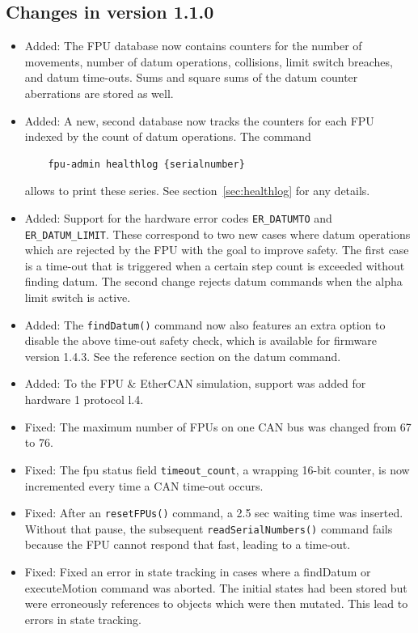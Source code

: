 \documentclass[11pt,a4paper]{report}
\begin{document}
\subsection*{Changes in version 1.1.0}
\begin{itemize}
\item Added: The FPU database now contains counters for the number of
  movements, number of datum operations, collisions, limit switch
  breaches, and datum time-outs. Sums and square sums of the datum
  counter aberrations are stored as well.

\item Added: A new, second database now tracks the counters for each
  FPU indexed by the count of datum operations. The command
  \begin{verbatim}
    fpu-admin healthlog {serialnumber}
  \end{verbatim}
  allows to print these series. See section~\ref{sec:healthlog} for
  any details.

\item Added: Support for the hardware error codes \texttt{ER\_DATUMTO}
  and \texttt{ER\_DATUM\_LIMIT}. These correspond to two new cases
  where datum operations which are rejected by the FPU with the goal
  to improve safety. The first case is a time-out that is triggered
  when a certain step count is exceeded without finding datum.  The
  second change rejects datum commands when the alpha limit switch is
  active.

\item Added: The \texttt{findDatum()} command now also features an
  extra option to disable the above time-out safety check, which is
  available for firmware version 1.4.3. See the reference section on
  the datum command.
  
\item Added: To the FPU \& EtherCAN simulation, support
  was added for hardware 1 protocol l.4. 
  
\item Fixed: The maximum number of FPUs on one CAN bus was changed
  from 67 to 76.
  
\item Fixed: The fpu status field \texttt{timeout\_count}, a wrapping
  16-bit counter, is now incremented every time a CAN time-out occurs.

\item Fixed: After an \texttt{resetFPUs()} command, a 2.5 sec waiting
  time was inserted. Without that pause, the subsequent
  \texttt{readSerialNumbers()} command fails because the FPU cannot
  respond that fast, leading to a time-out.

\item Fixed: Fixed an error in state tracking in cases where
  a findDatum or executeMotion command was aborted. The
  initial states had been stored but were erroneously
  references to objects which were then mutated. This lead
  to errors in state tracking.
  
\end{itemize}
 
\end{document}
